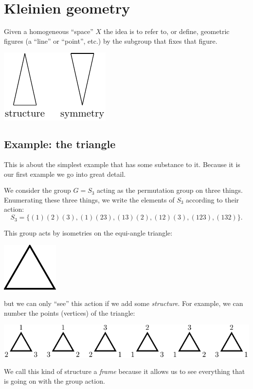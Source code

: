 \documentclass[11pt,oneside]{article}
\begin{document}
\section{Kleinien geometry}

Given a homogeneous ``space'' $X$ 
the idea is to refer to, or define, geometric 
figures (a ``line'' or ``point'', etc.)
by the subgroup that fixes that figure.

\begin{center}
\includegraphics[]{pic-structure.pdf} 
\end{center}

\subsection{Example: the triangle}

This is about the simplest example that has
some substance to it.
Because it is our first example we go into
great detail.

We consider the group $G = S_3$ 
acting as the permutation group on three things.
Enumerating these three things, we write
the elements of $S_3$ according to their
action:
$$
    S_3 = \bigl\{ (1)(2)(3), (1)(23), (13)(2), (12)(3), (123), (132) \bigr\}.
$$

This group acts by isometries on the equi-angle triangle:
\begin{center}
\includegraphics[]{pic-triangle.pdf} 
\end{center}
but we can only ``see'' this action if we add some
\emph{structure}. 
For example, we can number the
points (vertices) of the triangle:
\begin{center}
\includegraphics[]{pic-triangle-numbered.pdf} 
\end{center}
We call this kind of structure a \emph{frame}
because it allows us to see everything that is going on
with the group action.
\end{document}
